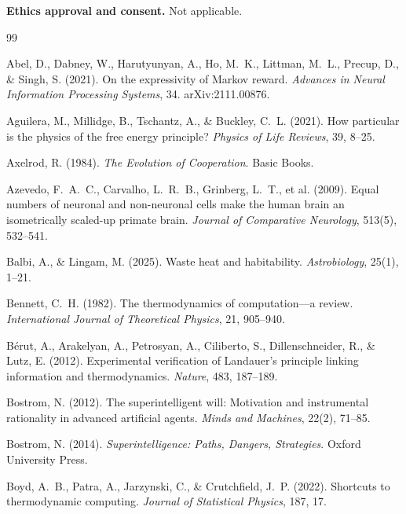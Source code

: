 \documentclass[11pt,twocolumn]{article}
\begin{document}
\textbf{Ethics approval and consent.} Not applicable.

\begin{thebibliography}{99}
\small
\setlength{\itemsep}{2pt}

 Abel, D., Dabney, W., Harutyunyan, A., Ho, M.~K., Littman, M.~L., Precup, D., \& Singh, S. (2021). On the expressivity of Markov reward. \emph{Advances in Neural Information Processing Systems}, 34. arXiv:2111.00876.

 Aguilera, M., Millidge, B., Tschantz, A., \& Buckley, C.~L. (2021). How particular is the physics of the free energy principle? \emph{Physics of Life Reviews}, 39, 8--25.

 Axelrod, R. (1984). \emph{The Evolution of Cooperation}. Basic Books.

 Azevedo, F.~A.~C., Carvalho, L.~R.~B., Grinberg, L.~T., et al. (2009). Equal numbers of neuronal and non-neuronal cells make the human brain an isometrically scaled-up primate brain. \emph{Journal of Comparative Neurology}, 513(5), 532--541.

 Balbi, A., \& Lingam, M. (2025). Waste heat and habitability. \emph{Astrobiology}, 25(1), 1--21.

 Bennett, C.~H. (1982). The thermodynamics of computation---a review. \emph{International Journal of Theoretical Physics}, 21, 905--940.

 Bérut, A., Arakelyan, A., Petrosyan, A., Ciliberto, S., Dillenschneider, R., \& Lutz, E. (2012). Experimental verification of Landauer's principle linking information and thermodynamics. \emph{Nature}, 483, 187--189.

 Bostrom, N. (2012). The superintelligent will: Motivation and instrumental rationality in advanced artificial agents. \emph{Minds and Machines}, 22(2), 71--85.

 Bostrom, N. (2014). \emph{Superintelligence: Paths, Dangers, Strategies}. Oxford University Press.

 Boyd, A.~B., Patra, A., Jarzynski, C., \& Crutchfield, J.~P. (2022). Shortcuts to thermodynamic computing. \emph{Journal of Statistical Physics}, 187, 17.


\end{thebibliography}
\end{document}
